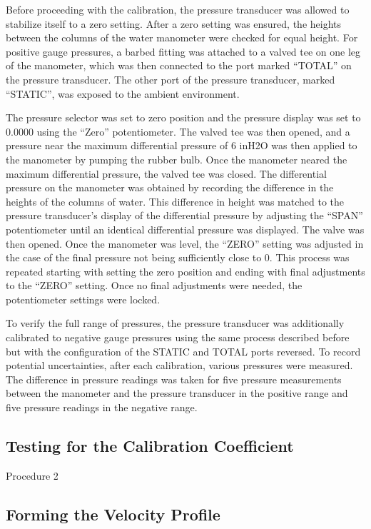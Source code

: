 \documentclass[journal,letterpaper]{IEEEtran}
\begin{document}
Before proceeding with the calibration, the pressure transducer was allowed to stabilize itself to a zero setting.
After a zero setting was ensured, the heights between the columns of the water manometer were checked for equal height.
For positive gauge pressures, a barbed fitting was attached to a valved tee on one leg of the manometer, which was then connected to the port marked “TOTAL” on the pressure transducer. 
The other port of the pressure transducer, marked “STATIC”, was exposed to the ambient environment.

The pressure selector was set to zero position and the pressure display was set to 0.0000 using the “Zero” potentiometer.
The valved tee was then opened, and a pressure near the maximum differential pressure of 6 inH2O was then applied to the manometer by pumping the rubber bulb.
Once the manometer neared the maximum differential pressure, the valved tee was closed.
The differential pressure on the manometer was obtained by recording the difference in the heights of the columns of water.
This difference in height was matched to the pressure transducer's display of the differential pressure by adjusting the “SPAN” potentiometer until an identical differential pressure was displayed.
The valve was then opened.
Once the manometer was level, the “ZERO” setting was adjusted in the case of the final pressure not being sufficiently close to 0.
This process was repeated starting with setting the zero position and ending with final adjustments to the “ZERO” setting.
Once no final adjustments were needed, the potentiometer settings were locked. 

To verify the full range of pressures, the pressure transducer was additionally calibrated to negative gauge pressures using the same process described before but with the configuration of the STATIC and TOTAL ports reversed.
To record potential uncertainties, after each calibration, various pressures were measured.
The difference in pressure readings was taken for five pressure measurements between the manometer and the pressure transducer in the positive range and five pressure readings in the negative range.

\subsection{Testing for the Calibration Coefficient}

Procedure 2

\subsection{Forming the Velocity Profile}
\end{document}
